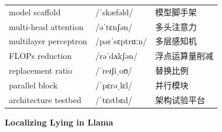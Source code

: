 \documentclass[UTF8,12pt,a4paper]{ctexart}
\providecommand{\zh}[1]{#1}
\begin{document}
\begin{tabular*}{\textwidth}{@{\extracolsep{\fill}}lll@{}}
model scaffold & {\ipafont /ˈskæfəld/} & \zh{模型脚手架} \\
multi-head attention & {\ipafont /əˈtɛnʃən/} & \zh{多头注意力} \\
multilayer perceptron & {\ipafont /pərˈsɛptrɑːn/} & \zh{多层感知机} \\
FLOPs reduction & {\ipafont /rəˈdʌkʃən/} & \zh{浮点运算量削减} \\
replacement ratio & {\ipafont /ˈreɪʃiˌoʊ/} & \zh{替换比例} \\
parallel block & {\ipafont /ˈpɛrəˌlɛl/} & \zh{并行模块} \\
architecture testbed & {\ipafont /ˈtɛstbɛd/} & \zh{架构试验平台} \\
\bottomrule
\end{tabular*}

\newpage

\begin{center}
    {\Large\bfseries Localizing Lying in Llama}
\end{center}
\end{document}
